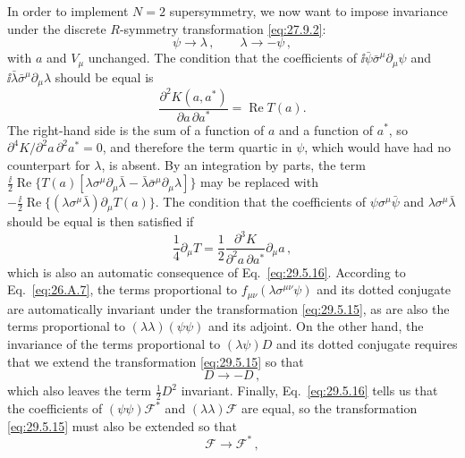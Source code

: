 In order to implement \(N=2\) supersymmetry, we now want to impose invariance
under the discrete \(R\)-symmetry transformation \eqref{eq:27.9.2}:
\begin{equation}
  \psi\longrightarrow\lambda\,,
  \qquad
  \lambda\longrightarrow-\psi\,,
  \tag{29.5.15}\label{eq:29.5.15}
\end{equation}
with \(a\) and \(V_\mu\) unchanged. The condition that the coefficients of
\(\ii\bar\psi\bar\sigma^\mu\partial_\mu\psi\) and
\(\ii\bar\lambda\bar\sigma^\mu\partial_\mu\lambda\) should be equal is
\begin{equation}
  \frac{\partial^2K(a,a^*)}{\partial a\,\partial a^*}
  =\operatorname{Re}T(a).
  \tag{29.5.16}\label{eq:29.5.16}
\end{equation}
The right-hand side is the sum of a function of \(a\) and a function of
\(a^*\), so
\(\partial^4K/\partial^2a\,\partial^2a^*=0\), and therefore the term quartic
in \(\psi\), which would have had no counterpart for \(\lambda\), is absent.
By an integration by parts, the term
\(\tfrac{\ii}{2}\operatorname{Re}\{T(a)
[\lambda\sigma^\mu\partial_\mu\bar\lambda
-\bar\lambda\bar\sigma^\mu\partial_\mu\lambda]\}\)
may be replaced with
\(-\tfrac{\ii}{2}\operatorname{Re}\{
(\lambda\sigma^\mu\bar\lambda)\partial_\mu T(a)\}\). The condition that
the coefficients of \(\psi\sigma^\mu\bar\psi\) and
\(\lambda\sigma^\mu\bar\lambda\) should be equal is then satisfied
if
\[
  \frac14\partial_\mu T
  =\frac12
    \frac{\partial^3K}{\partial^2a\,\partial a^*}\partial_\mu a\,,
\]
which is also an automatic consequence of Eq.~\eqref{eq:29.5.16}.
According to Eq.~\eqref{eq:26.A.7}, the terms proportional to
\(f_{\mu\nu}(\lambda\sigma^{\mu\nu}\psi)\) and its dotted conjugate are
automatically invariant under the transformation \eqref{eq:29.5.15}, as
are also the terms proportional to
\((\lambda\lambda)(\psi\psi)\) and its adjoint. On the other hand, the
invariance of the terms proportional to \((\lambda\psi)D\) and its dotted
conjugate requires that we
extend the transformation \eqref{eq:29.5.15} so that
\begin{equation}
  D\longrightarrow-D\,,
  \tag{29.5.17}\label{eq:29.5.17}
\end{equation}
which also leaves the term \(\tfrac12D^2\) invariant. Finally,
Eq.~\eqref{eq:29.5.16} tells us that the coefficients of
\((\psi\psi)\mathcal{F}^*\) and
\((\lambda\lambda)\mathcal{F}\) are equal, so the transformation
\eqref{eq:29.5.15} must also be extended so that
\begin{equation}
  \mathcal{F}\longrightarrow\mathcal{F}^*\,,
  \tag{29.5.18}\label{eq:29.5.18}
\end{equation}
